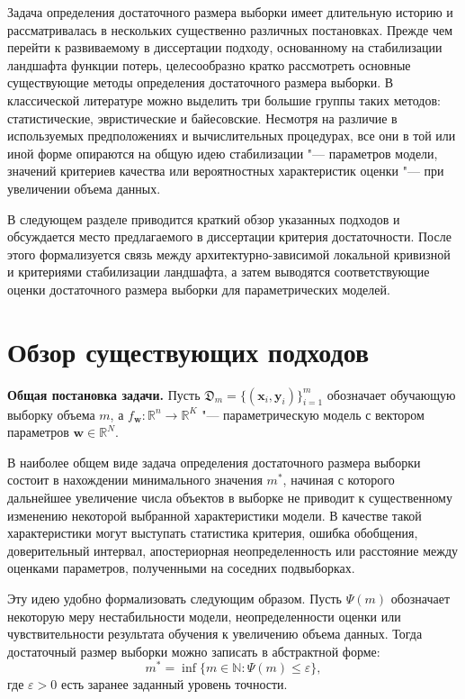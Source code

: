 Задача определения достаточного размера выборки имеет длительную историю и рассматривалась в нескольких существенно различных постановках. Прежде чем перейти к развиваемому в диссертации подходу, основанному на стабилизации ландшафта функции потерь, целесообразно кратко рассмотреть основные существующие методы определения достаточного размера выборки. В классической литературе можно выделить три большие группы таких методов: статистические, эвристические и байесовские. Несмотря на различие в используемых предположениях и вычислительных процедурах, все они в той или иной форме опираются на общую идею стабилизации "--- параметров модели, значений критериев качества или вероятностных характеристик оценки "--- при увеличении объема данных.

В следующем разделе приводится краткий обзор указанных подходов и обсуждается место предлагаемого в диссертации критерия достаточности. После этого формализуется связь между архитектурно-зависимой локальной кривизной и критериями стабилизации ландшафта, а затем выводятся соответствующие оценки достаточного размера выборки для параметрических моделей.

\section{Обзор существующих подходов}

\textbf{Общая постановка задачи.} Пусть $\mathfrak D_m=\{(\mathbf x_i, \mathbf y_i)\}_{i=1}^m$ обозначает обучающую выборку объема $m$, а $f_{\mathbf w}:\mathbb R^n\to\mathbb R^K$ "--- параметрическую модель с вектором параметров $\mathbf w\in\mathbb R^N$.

В наиболее общем виде задача определения достаточного размера выборки состоит в нахождении минимального значения $m^*$, начиная с которого дальнейшее увеличение числа объектов в выборке не приводит к существенному изменению некоторой выбранной характеристики модели. В качестве такой характеристики могут выступать статистика критерия, ошибка обобщения, доверительный интервал, апостериорная неопределенность или расстояние между оценками параметров, полученными на соседних подвыборках.

Эту идею удобно формализовать следующим образом. Пусть $\Psi(m)$ обозначает некоторую меру нестабильности модели, неопределенности оценки или чувствительности результата обучения к увеличению объема данных. Тогда достаточный размер выборки можно записать в абстрактной форме:
\begin{equation}
    \label{eq:review-general-mstar}
    m^*=\inf\{m\in\mathbb N:\Psi(m)\le \varepsilon\},
\end{equation}
где $\varepsilon>0$ есть заранее заданный уровень точности.

